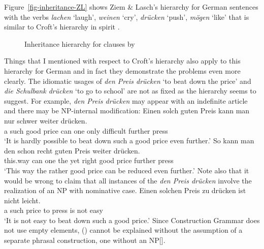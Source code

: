 \begin{exe}
\begin{xlist}[iv.]
\begin{exe}
\begin{xlist}[iv.]
Figure~\vref{fig-inheritance-ZL} shows Ziem \& Lasch's hierarchy for German sentences with the verbs \emph{lachen} `laugh', \emph{weinen} `cry', \emph{drücken}
`push', \emph{mögen} `like' that is similar to Croft's hierarchy in spirit \citep[]{ZL2013a-u}.
\begin{figure}
\caption{Inheritance hierarchy for clauses by \citet[]{ZL2013a-u}}\label{fig-inheritance-ZL}
\end{figure}
Things that I mentioned with respect to Croft's hierarchy also apply to this hierarchy for German
and in fact they demonstrate the problems even more clearly. The idiomatic usages of \emph{den Preis
  drücken} `to beat down the price' and \emph{die Schulbank drücken} `to go to school' are not as
fixed as the hierarchy seems to suggest. For example, \emph{den Preis drücken} may appear with an
indefinite article and there may be NP-internal modification:
\eal
\ex\label{ex-einen-solch-guten-Pries-kann} 
\gll Einen solch guten Preis kann man nur schwer weiter drücken.\\
     a     such  good  price can  one only difficult further press\\
\glt `It is hardly possible to beat down such a good price even further.'
\ex 
\gll So kann man den schon recht guten Preis weiter drücken.\\
     this.way can one the yet right good price further press\\
\glt `This way the rather good price can be reduced even further.'
\zl
Note also that it would be wrong to claim that all instances of the \emph{den Preis drücken} involve
the realization of an NP with nominative case.
\ea
\gll Einen solchen Preis zu drücken ist nicht leicht.\\
     a     such    price to press   is  not   easy\\
\glt `It is not easy to beat down such a good price.'
\z
Since Construction Grammar does not use empty elements, () cannot be explained without the
assumption of a separate phrasal construction, one without an NP[].


\end{xlist}
\end{exe}
\end{xlist}
\end{exe}
